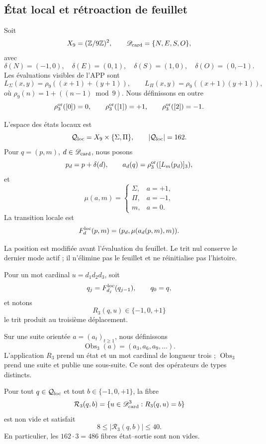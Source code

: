 {\subsection{État local et rétroaction de feuillet}

Soit
\[
 X_9=(\mathbb Z/9\mathbb Z)^2,
 \qquad
 \mathscr D_{\rm card}=\{N,E,S,O\},
\]
avec
\[
 \delta(N)=(-1,0),\quad \delta(E)=(0,1),\quad
 \delta(S)=(1,0),\quad \delta(O)=(0,-1).
\]
Les évaluations visibles de l’APP sont
\[
 L_\Sigma(x,y)=\rho_9((x+1)+(y+1)),
 \qquad
 L_\Pi(x,y)=\rho_9((x+1)(y+1)),
\]
où \(\rho_9(n)=1+((n-1)\bmod9)\). Nous définissons en outre
\[
 \rho_3^{\rm or}([0])=0,
 \qquad
 \rho_3^{\rm or}([1])=+1,
 \qquad
 \rho_3^{\rm or}([2])=-1.
\]

\begin{definition}
\label{p12-83-c1-s8:def:u006a-factor-local}
L’espace des états locaux est
\[
 \mathcal Q_{\rm loc}=X_9\times\{\Sigma,\Pi\},
 \qquad |\mathcal Q_{\rm loc}|=162.
\]
Pour \(q=(p,m)\), \(d\in\mathscr D_{\rm card}\), nous posons
\[
 p_d=p+\delta(d),
 \qquad
 a_d(q)=\rho_3^{\rm or}([L_m(p_d)]_3),
\]
et
\[
 \mu(a,m)=
 \begin{cases}
  \Sigma,&a=+1,\\
  \Pi,&a=-1,\\
  m,&a=0.
 \end{cases}
\]
La transition locale est
\[
 F_d^{\rm loc}(p,m)=(p_d,\mu(a_d(p,m),m)).
\]
\end{definition}

La position est modifiée avant l’évaluation du feuillet. Le trit nul conserve le
dernier mode actif ; il n’élimine pas le feuillet et ne réinitialise pas l’histoire.

Pour un mot cardinal \(u=d_1d_2d_3\), soit
\[
 q_j=F_{d_j}^{\rm loc}(q_{j-1}),\qquad q_0=q,
\]
et notons
\[
 R_3(q,u)\in\{-1,0,+1\}
\]
le trit produit au troisième déplacement.

\begin{definition}
\label{p12-83-c1-s8:def:u006a-obs3}
Sur une suite orientée \(a=(a_t)_{t\geq1}\), nous définissons
\[
 \operatorname{Obs}_3(a)=(a_3,a_6,a_9,\ldots).
\]
L’application \(R_3\) prend un état et un mot cardinal de longueur trois ;
\(\operatorname{Obs}_3\) prend une suite et publie une sous-suite. Ce sont
des opérateurs de types distincts.
\end{definition}

\begin{theorem}
\label{p12-83-c1-s8:thm:u006a-sobreyectividad-r3}
Pour tout \(q\in\mathcal Q_{\rm loc}\) et tout
\(b\in\{-1,0,+1\}\), la fibre
\[
 \mathcal R_3(q,b)
 =\{u\in\mathscr D_{\rm card}^3:R_3(q,u)=b\}
\]
est non vide et satisfait
\[
 \boxed{8\leq |\mathcal R_3(q,b)|\leq40.}
\]
En particulier, les \(162\cdot3=486\) fibres état--sortie sont non vides.
\end{theorem}

}
